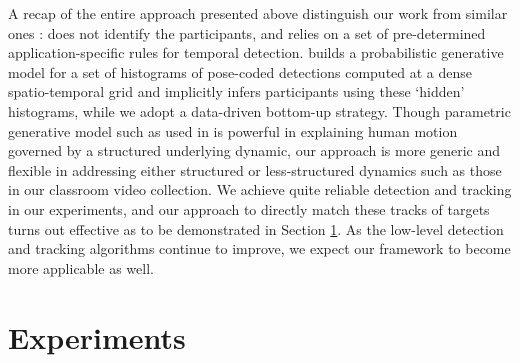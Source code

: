 \documentclass[10pt,twocolumn,letterpaper]{article}
\begin{document}
A recap of the entire approach presented above distinguish our work from similar ones \cite{Ryoo:group,Amer:group}: \cite{Ryoo:group} does not identify the participants, and relies on a set of pre-determined application-specific rules for temporal detection. \cite{Amer:group} builds a probabilistic generative model for a set of histograms of pose-coded detections computed at a dense spatio-temporal grid and implicitly infers participants using these `hidden' histograms, while we adopt a data-driven bottom-up strategy. Though parametric generative model such as used in \cite{Ryoo:group} is powerful in explaining human motion governed by a structured underlying dynamic, our approach is more generic and flexible in addressing either structured or less-structured dynamics such as those in our classroom video collection. We achieve quite reliable detection and tracking in our experiments, and our approach to directly match these tracks of targets turns out effective as to be demonstrated in Section \ref{expall}. As the low-level detection and tracking algorithms continue to improve, we expect our framework to become more applicable as well.


\section{Experiments}
\label{expall}
\end{document}
